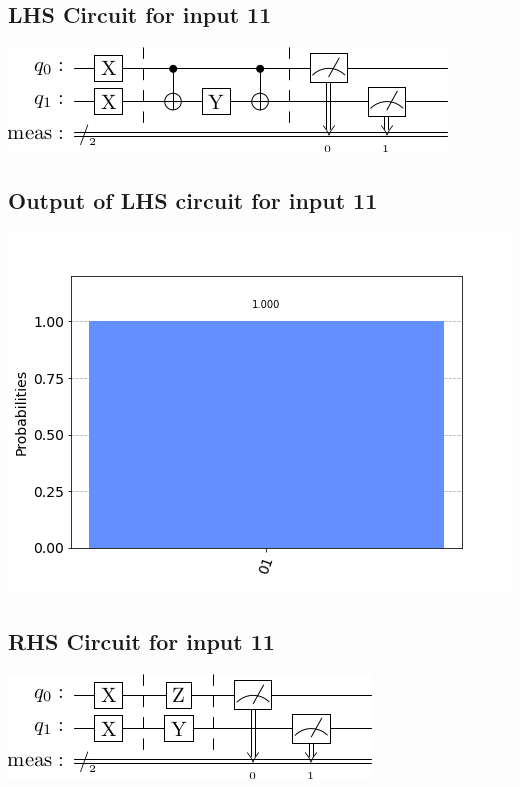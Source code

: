 \documentclass[a4paper]{article}
\begin{document}
\begin{answer}[Qeusiton 1 b (c)]
        \subsection*{LHS Circuit for input 11}
        \includegraphics[scale=0.5]{c111.png}
        \subsection*{Output of LHS circuit for input 11}
        \includegraphics[scale = 0.5]{c111-out.png}
        \subsection*{RHS Circuit for input 11}
        \includegraphics[scale=0.5]{c211.png}

\end{answer}
\end{document}

